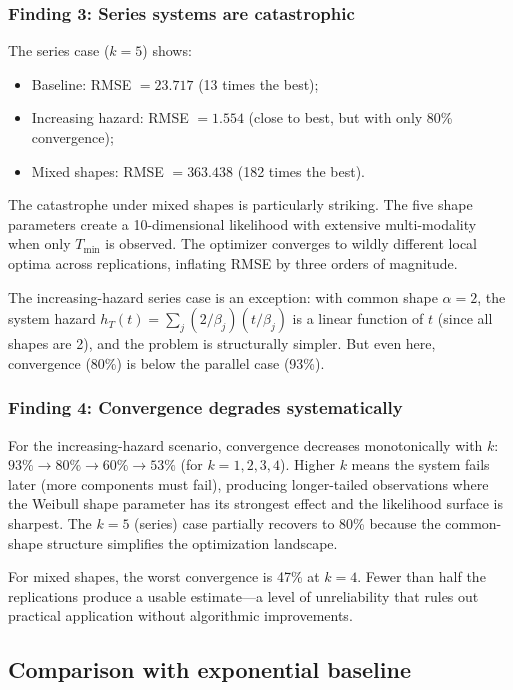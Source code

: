 \documentclass[12pt]{article}
\theoremstyle{definition}
\theoremstyle{remark}
\begin{document}
\subsubsection{Finding 3: Series systems are catastrophic}

The series case ($k = 5$) shows:
\begin{itemize}
\item Baseline: RMSE $= 23.717$ (13 times the best);
\item Increasing hazard: RMSE $= 1.554$ (close to best, but with
  only 80\% convergence);
\item Mixed shapes: RMSE $= 363.438$ (182 times the best).
\end{itemize}

The catastrophe under mixed shapes is particularly striking.  The
five shape parameters create a 10-dimensional likelihood with
extensive multi-modality when only $T_{\min}$ is observed.  The
optimizer converges to wildly different local optima across
replications, inflating RMSE by three orders of magnitude.

The increasing-hazard series case is an exception: with common
shape $\alpha = 2$, the system hazard
$h_T(t) = \sum_j (2/\beta_j)(t/\beta_j)$ is a linear function of
$t$ (since all shapes are 2), and the problem is structurally
simpler.  But even here, convergence (80\%) is below the parallel
case (93\%).

\subsubsection{Finding 4: Convergence degrades systematically}

For the increasing-hazard scenario, convergence decreases
monotonically with $k$: $93\% \to 80\% \to 60\% \to 53\%$
(for $k = 1, 2, 3, 4$).  Higher $k$ means the system fails later
(more components must fail), producing longer-tailed observations
where the Weibull shape parameter has its strongest effect and the
likelihood surface is sharpest.  The $k = 5$ (series) case
partially recovers to 80\% because the common-shape structure
simplifies the optimization landscape.

For mixed shapes, the worst convergence is 47\% at $k = 4$.  Fewer
than half the replications produce a usable estimate---a level of
unreliability that rules out practical application without
algorithmic improvements.

\subsection{Comparison with exponential baseline}
\end{document}
